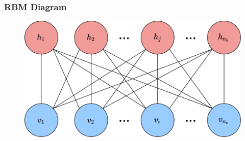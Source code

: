 \documentclass{beamer}
\begin{document}
\begin{frame}
    \frametitle{RBM Diagram}
    \begin{figure}
        \includegraphics[width=1\linewidth]{rbm_diagram.png}
    \end{figure}
\end{frame}

\end{document}
